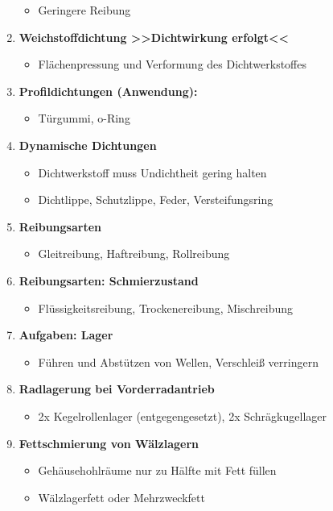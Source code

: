 \begin{enumerate}
  \begin{itemize}
  \item
    Geringere Reibung
  \end{itemize}
\item
  \textbf{Weichstoffdichtung >>Dichtwirkung erfolgt<<}

  \begin{itemize}
  \item
    Flächenpressung und Verformung des Dichtwerkstoffes
  \end{itemize}
\item
  \textbf{Profildichtungen (Anwendung):}

  \begin{itemize}
  \item
    Türgummi, o-Ring
  \end{itemize}
\item
  \textbf{Dynamische Dichtungen}

  \begin{itemize}
  \item
    Dichtwerkstoff muss Undichtheit gering halten
  \item
    Dichtlippe, Schutzlippe, Feder, Versteifungsring
  \end{itemize}
\item
  \textbf{Reibungsarten}

  \begin{itemize}
  \item
    Gleitreibung, Haftreibung, Rollreibung
  \end{itemize}
\item
  \textbf{Reibungsarten: Schmierzustand}

  \begin{itemize}
  \item
    Flüssigkeitsreibung, Trockenereibung, Mischreibung
  \end{itemize}
\item
  \textbf{Aufgaben: Lager}

  \begin{itemize}
  \item
    Führen und Abstützen von Wellen, Verschleiß verringern
  \end{itemize}
\item
  \textbf{Radlagerung bei Vorderradantrieb}

  \begin{itemize}
  \item
    2x Kegelrollenlager (entgegengesetzt), 2x Schrägkugellager
  \end{itemize}
\item
  \textbf{Fettschmierung von Wälzlagern}

  \begin{itemize}
  \item
    Gehäusehohlräume nur zu Hälfte mit Fett füllen
  \item
    Wälzlagerfett oder Mehrzweckfett
  \end{itemize}
\end{enumerate}

